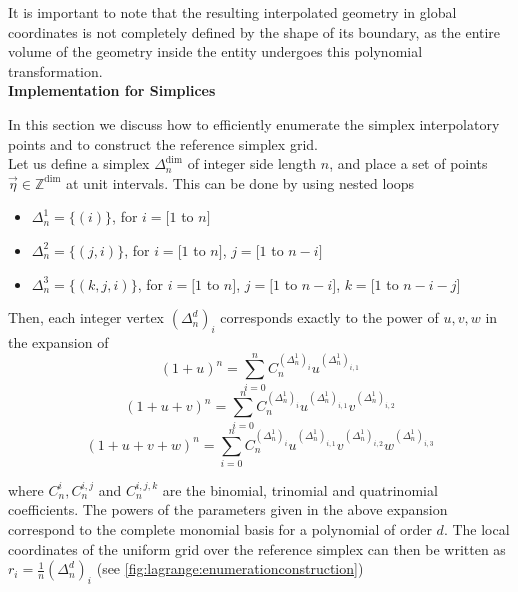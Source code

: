 \noindent
It is important to note that the resulting interpolated geometry in global coordinates is not completely defined by the shape of its boundary, as the entire volume of the geometry inside the entity undergoes this polynomial transformation. \\


\noindent
\textbf{Implementation for Simplices}

\noindent
In this section we discuss how to efficiently enumerate the simplex interpolatory points and to construct the reference simplex grid. \\

\noindent
Let us define a simplex $\Delta^{\dim}_{n}$ of integer side length $n$, and place a set of points $\vec{\eta} \in \mathbb{Z}^{\dim}$ at unit intervals. This can be done by using nested loops
\begin{itemize}
	\item $\Delta^{1}_n = \{(i)\}$, for $i = [1$ to $n]$
	\item $\Delta^{2}_n = \{(j,i)\}$, for $i = [1$ to $n]$, $j = [1$ to $n - i]$
	\item $\Delta^{3}_n = \{(k,j,i)\}$, for $i = [1$ to $n]$, $j = [1$ to $n - i]$, $k = [1$ to $n - i - j]$
\end{itemize}

\noindent
Then, each integer vertex $(\Delta^{d}_n)_i$ corresponds exactly to the power of $u,v,w$ in the expansion of
\[ (1 + u)^n = \sum_{i=0}^n C^{(\Delta^{1}_n)_i}_n u^{(\Delta^{1}_n)_{i,1}} \]
\[ (1 + u + v)^n = \sum_{i=0}^n C^{(\Delta^{1}_n)_i}_n u^{(\Delta^{1}_n)_{i,1}} v^{(\Delta^{1}_n)_{i,2}} \]
\[ (1 + u + v + w)^n = \sum_{i=0}^n C^{(\Delta^{1}_n)_i}_n u^{(\Delta^{1}_n)_{i,1}} v^{(\Delta^{1}_n)_{i,2}} w^{(\Delta^{1}_n)_{i,3}} \]

\noindent
where $C^{i}_n, C^{i,j}_n$ and $C^{i,j,k}_n$ are the binomial, trinomial and quatrinomial coefficients. The powers of the parameters given in the above expansion correspond to the complete monomial basis for a polynomial of order $d$. The local coordinates of the uniform grid over the reference simplex can then be written as $r_i = \frac{1}{n}(\Delta^{d}_n)_i$ (see \cref{fig:lagrange:enumerationconstruction})

